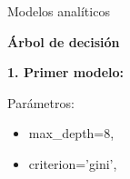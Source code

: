 \documentclass[pdf]{beamer}
\def\vspace{}%
\begin{document}
{%
%
%
%    
%        
%
%
%
%

        

\begin{frame}{Modelos analíticos}

    \begin{Large}
        \textbf{Árbol de decisión}
    \end{Large}

     \textbf{1. Primer modelo:}

    Parámetros:
    \begin{itemize}
        \item max\_depth=8,
        \item criterion='gini',
    \end{itemize}


\end{frame}}
\end{document}
